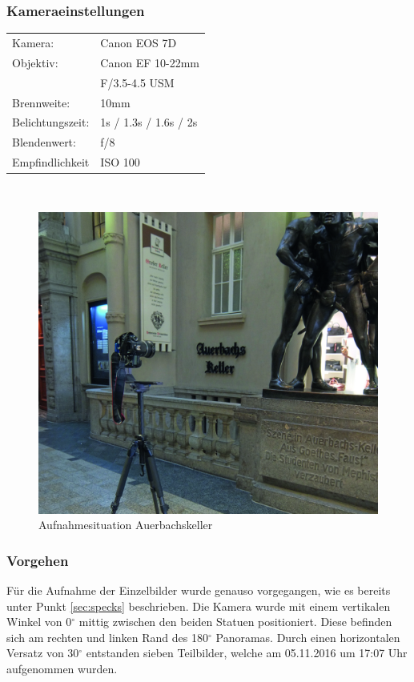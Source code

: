 \documentclass[liststotoc,bibtotoc,fontsize=14pt,]{scrreprt}
\begin{document}
	\subsubsection{Kameraeinstellungen}
	\begin{minipage}{0.58\textwidth}
		\begin{tabular}{ll}
			Kamera: &Canon EOS 7D \\
			Objektiv: &Canon EF 10-22mm \\
			& F/3.5-4.5 USM\\		
			Brennweite:& 10mm \\
			Belichtungszeit: & 1s / 1.3s / 1.6s / 2s\\
			Blendenwert: & f/8\\
			Empfindlichkeit & ISO 100 \\
		\end{tabular}\\
	\end{minipage}%
	\begin{minipage}{0.42\textwidth}
		\begin{figure}[H]
			\includegraphics[width=\linewidth]{img/places/ak.jpg}
			\caption{Aufnahmesituation Auerbachskeller}
			\label{img:ak}
		\end{figure}
	\end{minipage}%
	

	
	\subsubsection{Vorgehen}
	Für die Aufnahme der Einzelbilder wurde genauso vorgegangen, wie es bereits unter Punkt \ref{sec:specks} beschrieben. Die Kamera wurde mit einem vertikalen Winkel von 0$^\circ$ mittig zwischen den beiden Statuen positioniert. Diese befinden sich am rechten und linken Rand des 180$^\circ$ Panoramas. Durch einen horizontalen Versatz von 30$^\circ$ entstanden sieben Teilbilder, welche am 05.11.2016 um 17:07 Uhr aufgenommen wurden. 
\end{document}
